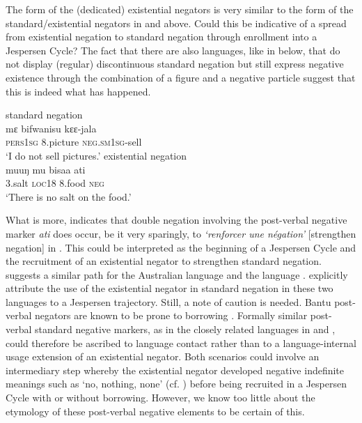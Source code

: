 \documentclass[output=paper,draft,draftmode,colorlinks,citecolor=brown]{langscibook}
\begin{document}
%
The form of the (dedicated) existential negators is very similar to the
form of the standard\slash existential negators in  and  above. Could this be indicative of a spread from existential negation to standard negation through enrollment into a Jespersen Cycle? The fact that there are also languages, like  in  below, that do not display (regular) discontinuous standard negation but still express negative existence through the combination of a figure and a negative particle suggest that this is indeed what has happened. 
%

\ea\label{ex:dzing-climb-salt}
%

\ea standard negation\\
\gll mɛ bifwanisu kɛɛ-jala\\
	\textsc{pers1sg} 8.picture \textsc{neg.sm1sg}-sell\\
\glt 	`I do not sell pictures.'
%
\ex existential negation\\
\gll	muuŋ mu bisaa    ati\\
      3.salt    \textsc{loc18} 8.food \textsc{neg}\\
\glt 	`There is no salt on the food.'
\z
\z

%
What is more, \citet[378]{Mertens1938} indicates that double negation
involving the post-verbal negative marker \textit{ati} does occur, be it
very sparingly, to \textit{`renforcer une n{é}gation'} [strengthen
negation] in . This could be interpreted as the beginning of a
Jespersen Cycle and the recruitment of an existential negator to strengthen
standard negation. \citet{Croft1991} suggests a similar path for the
Australian language  and the  language .
explicitly attribute the use of the
existential negator in standard negation in these two languages to a
Jespersen trajectory. Still, a note of caution is needed. Bantu post-verbal
negators are known to be prone to borrowing \citep[180]{Nurse2008}.
Formally similar post-verbal standard negative markers, as in the closely
related languages in  and
, could therefore be ascribed to language contact
rather than to a language-internal usage extension of an existential
negator. Both scenarios could involve an intermediary step whereby the
existential negator developed negative indefinite meanings such as `no,
nothing, none' (cf. ) before being recruited in a Jespersen Cycle with or without borrowing. However, we know too little about the etymology of these post-verbal negative elements to be certain of this.
\end{document}
